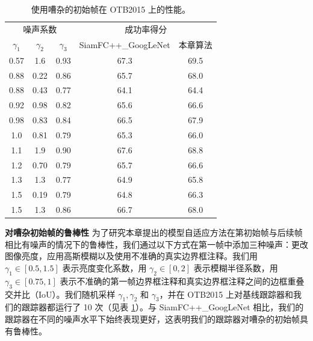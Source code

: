 \begin{table}[t]
\centering
\caption{使用嘈杂的初始帧在 OTB2015 上的性能。}
\begin{tabular}{c c c c c}
\toprule
\multicolumn{3}{c}{噪声系数} & \multicolumn{2}{c}{成功率得分} \\
\cmidrule(lr){1-3} \cmidrule(lr){4-5}
$\gamma_1$ & $\gamma_2$ & $\gamma_3$  & SiamFC++\_GoogLeNet & 本章算法  \\
\midrule
0.57  &	1.6	 & 0.93	& 67.3    & 69.5 \\
0.88  & 0.22 & 0.86 & 65.7    & 68.0 \\
0.88  & 0.43 & 0.77 & 64.1    & 64.4 \\
0.92  & 0.98 & 0.82 & 65.6    & 66.6 \\
0.98  & 0.83 & 0.84 & 66.5    & 67.9 \\
1.0   & 0.81 & 0.79 & 65.3    & 66.0 \\
1.1   &	1.9  & 0.90	& 67.6    & 68.8 \\
1.2   & 0.70 & 0.79 & 65.7    & 66.6 \\
1.3   & 1.3  & 0.77 & 64.9    & 65.8 \\
1.5   & 0.19 & 0.79 & 64.8    & 66.3 \\
1.5   & 1.3  & 0.86 & 66.7    & 68.0 \\
\bottomrule
\end{tabular}
\label{table:noise}
\end{table}

\textbf{对嘈杂初始帧的鲁棒性} 为了研究本章提出的模型自适应方法在第初始帧与后续帧相比有噪声的情况下的鲁棒性，我们通过以下方式在第一帧中添加三种噪声：更改图像亮度，应用高斯模糊以及使用不准确的真实边界框注释。我们用 $\gamma_1 \in [0.5, 1.5]$ 表示亮度变化系数，用 $\gamma_2 \in [0, 2]$ 表示模糊半径系数，用 $\gamma_3 \in [0.75, 1]$ 表示不准确的第一帧边界框注释和真实边界框注释之间的边框重叠交并比（IoU）。我们随机采样 $\gamma_1, \gamma_2$ 和 $\gamma_3$，并在 OTB2015 上对基线跟踪器和我们的跟踪器都运行了 10 次（见表 \ref{table:noise}）。与 SiamFC++\_GoogLeNet \cite{SiamFC++} 相比，我们的跟踪器在不同的噪声水平下始终表现更好，这表明我们的跟踪器对嘈杂的初始帧具有鲁棒性。%

